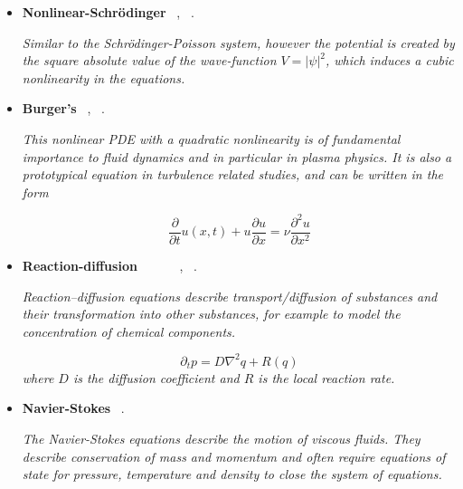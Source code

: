 \documentclass[12pt,letterpaper]{article}
\begin{document}
\begin{itemize}
\begin{itemize}
\begin{itemize}
                    \item \textbf{Nonlinear-Schrödinger}  ~\cite{garcia-molinaQuantumFourierAnalysis2022}, ~\cite{lubaschVariationalQuantumAlgorithms2020}.
                    
                    \textit{Similar to the Schrödinger-Poisson system, however the potential is created by the square absolute value of the wave-function $V=|\psi|^2$, which induces a cubic nonlinearity in the equations.}
                    
                   \item \textbf{Burger's}  ~\cite{zylbermanHybridQuantumClassicalAlgorithm2022},  ~\cite{ozSolvingBurgersEquation2021}.
                   
                   \textit{This nonlinear PDE with a quadratic nonlinearity is of fundamental importance to fluid dynamics and in particular in plasma physics. It is also a prototypical equation in turbulence related studies, and can be written in the form}

                   $$\dfrac{\partial }{\partial t} u(x,t) +u \dfrac{\partial u}{\partial x} = \nu \dfrac{\partial^2 u}{\partial x^2}$$
       
    			\item \textbf{Reaction-diffusion} ~ ~\cite{leongVariationalQuantumEvolution2022} ~ ~\cite{demirdjianVariationalQuantumSolutions2022},  ~\cite{anEfficientQuantumAlgorithm2022}.
       
                \textit{Reaction–diffusion equations describe transport/diffusion of substances and their transformation into other substances, for example to model the concentration of chemical components.}
                
                $$ \partial_t p = D \nabla^2 q + R(q)$$
                \textit{where $D$ is the diffusion coefficient and $R$ is the local reaction rate.}       
    
                \item \textbf{Navier-Stokes}  ~\cite{gaitanFindingFlowsNavier2020}.
                
                \textit{The Navier-Stokes equations describe the motion of viscous fluids. They describe conservation of mass and momentum and often require equations of state for pressure, temperature and density to close the system of equations.}


\end{itemize}
\end{itemize}
\end{itemize}
\end{document}
